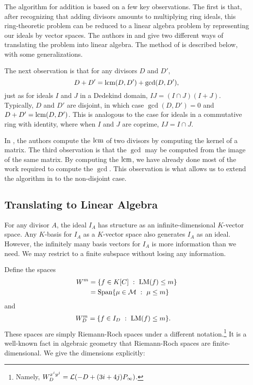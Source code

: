The algorithm for addition is based on a few key observations.
The first is that, after recognizing that adding divisors amounts to multiplying ring ideals,
this ring-theoretic problem can be reduced to a linear algebra problem by representing our ideals by vector spaces.
The authors in \cite{salem07} and \cite{arita05-2} give two different ways of translating the problem into linear algebra.
The method of \cite{salem07} is described below, with some generalizations.

The next observation is that for any divisors $D$ and $D'$,
  \[D + D' = \lcm(D, D') + \gcd(D, D'),\]
just as for ideals $I$ and $J$ in a Dedekind domain, $IJ = (I \cap J)(I + J)$.
Typically, $D$ and $D'$ are disjoint, in which case $\gcd(D, D') = 0$ and $D + D' = \lcm(D, D')$.
This is analogous to the case for ideals in a commutative ring with identity,
where when $I$ and $J$ are coprime, $IJ = I \cap J$.

In \cite{salem07}, the authors compute the $\lcm$ of two divisors by computing the kernel of a matrix.
The third observation is that the $\gcd$ may be computed from the image of the same matrix.
By computing the $\lcm$, we have already done most of the work required to compute the $\gcd$.
This observation is what allows us to extend the algorithm in \cite{salem07} to the non-disjoint case.

\subsection{Translating to Linear Algebra}

For any divisor $A$, the ideal $I_A$ has structure as an infinite-dimensional $K$-vector space.
Any $K$-basis for $I_A$ as a $K$-vector space also generates $I_A$ as an ideal.
However, the infinitely many basis vectors for $I_A$ is more information than we need.
We may restrict to a finite subspace without losing any information.

Define the spaces
\begin{align*}
  W^m &= \{ f \in K[C] ~:~ \LM(f) \leq m \} \\
      &= \Span\{ \mu \in \cal M ~:~ \mu \leq m \}
\end{align*}
and
\begin{align*}
  W_D^m &= \{ f \in I_D ~:~ \LM(f) \leq m \}.
\end{align*}
These spaces are simply Riemann-Roch spaces under a different notation.\footnote
{Namely, $W_D^{x^iy^j} = \cal L(-D + (3i+4j)P_\infty)$.}
It is a well-known fact in algebraic geometry that Riemann-Roch spaces are finite-dimensional.
We give the dimensions explicitly:

